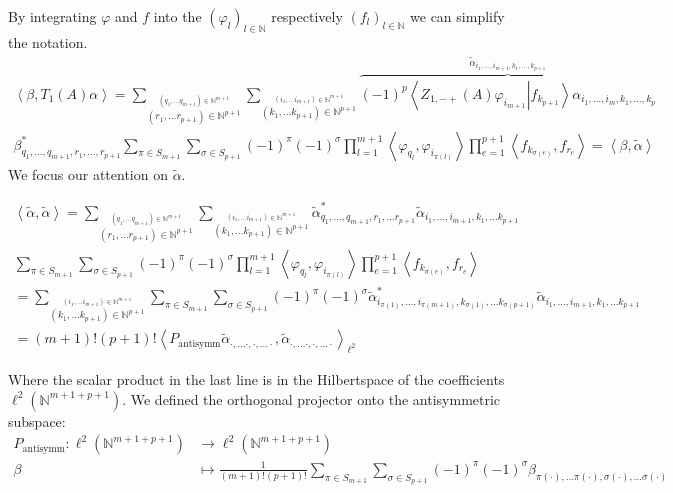 \documentclass[a4paper,12pt]{article}
\begin{document}
By integrating \(\varphi\) and \(f\) into the \((\varphi_l)_{l\in \mathbb{N}}\) respectively \((f_l)_{l\in \mathbb{N}}\) we can simplify the notation.
\begin{multline}
\left< \beta, T_1(A) \alpha \right> =\sum_{\stackrel{(q_1,\dots q_{m+1})\in \mathbb{N}^{m+1}}{(r_1,\dots r_{p+1})\in \mathbb{N}^{p+1}}}\sum_{\stackrel{(i_1,\dots i_{m+1})\in \mathbb{N}^{m+1}}{(k_1,\dots k_{p+1})\in \mathbb{N}^{p+1}}}  \overbrace{(-1)^{p}\left<Z_{1,-+}(A)\varphi_{i_{m+1}}\right|\left. f_{k_{p+1}}\right>\alpha_{i_1,\dots, i_m, k_1, \dots, k_p}}^{\tilde{\alpha}_{i_1,\dots, i_{m+1}, k_1, \dots, k_{p+1}}}\\
 \beta^*_{q_1,\dots, q_{m+1}, r_1, \dots, r_{p+1}} \sum_{\pi \in S_{m+1}} \sum_{\sigma \in S_{p+1}} (-1)^\pi (-1)^\sigma \prod_{l=1}^{m+1} \left< \varphi_{q_l} , \varphi_{i_{\pi(l)}} \right> \prod_{e=1}^{p+1} \left< f_{k_{\sigma(e)}} ,  f_{r_e}\right>
= \left< \beta, \tilde{\alpha} \right>
\end{multline}
We focus our attention on \(\tilde{\alpha}\).

\begin{multline}
\left< \tilde{\alpha},\tilde{\alpha} \right> = \sum_{\stackrel{(q_1,\dots q_{m+1})\in \mathbb{N}^{m+1}}{(r_1,\dots r_{p+1})\in \mathbb{N}^{p+1}}}\sum_{\stackrel{(i_1,\dots i_{m+1})\in \mathbb{N}^{m+1}}{(k_1,\dots k_{p+1})\in \mathbb{N}^{p+1}}} \tilde{\alpha}^*_{q_1, \dots, q_{m+1}, r_1, \dots r_{p+1}} \tilde{\alpha}_{i_1, \dots, i_{m+1}, k_1, \dots k_{p+1}}\\
\sum_{\pi\in S_{m+1}}\sum_{\sigma \in S_{p+1}} (-1)^\pi (-1)^\sigma \prod_{l=1}^{m+1} \left< \varphi_{q_l} , \varphi_{i_{\pi(l)}} \right> \prod_{e=1}^{p+1} \left< f_{k_{\sigma(e)}} ,  f_{r_e}\right>\\
=\sum_{\stackrel{(i_1,\dots i_{m+1})\in \mathbb{N}^{m+1}}{(k_1,\dots k_{p+1})\in \mathbb{N}^{p+1}}} \sum_{\pi\in S_{m+1}}\sum_{\sigma \in S_{p+1}} (-1)^\pi (-1)^\sigma  \tilde{\alpha}^*_{i_{\pi(1)}, \dots, i_{\pi(m+1)}, k_{\sigma(1)}, \dots k_{\sigma(p+1)}} \tilde{\alpha}_{i_1, \dots, i_{m+1}, k_1, \dots k_{p+1}}\\
=(m+1)! (p+1)!\left< P_{\text{antisymm}}\tilde{\alpha}_{\cdot, \dots \cdot, \cdot, \dots \cdot},\tilde{\alpha}_{\cdot, \dots \cdot, \cdot, \dots \cdot} \right>_{\ell^2}
\end{multline}

Where the scalar product in the last line is in the Hilbertspace of the coefficients \(\ell^2(\mathbb{N}^{m+1+p+1})\). We defined the orthogonal projector onto the antisymmetric subspace: 
\begin{equation}
\begin{aligned}
P_{\text{antisymm}} : \ell^2(\mathbb{N}^{m+1+p+1}) &\rightarrow \ell^2(\mathbb{N}^{m+1+p+1})\\
\beta &\mapsto \frac{1}{(m+1)!(p+1)!}\sum_{\pi \in S_{m+1}}\sum_{\sigma \in S_{p+1}} (-1)^\pi (-1)^\sigma \beta_{\pi(\cdot), \dots \pi(\cdot), \sigma (\cdot), \dots \sigma (\cdot)}
\end{aligned}
\end{equation}
\end{document}
